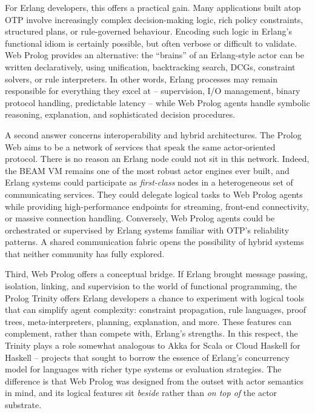 For Erlang developers, this offers a practical gain. Many applications built atop OTP involve increasingly complex decision-making logic, rich policy constraints, structured plans, or rule-governed behaviour. Encoding such logic in Erlang's functional idiom is certainly possible, but often verbose or difficult to validate. Web Prolog provides an alternative: the ``brains'' of an Erlang-style actor can be written declaratively, using unification, backtracking search, DCGs, constraint solvers, or rule interpreters. In other words, Erlang processes may remain responsible for everything they excel at -- supervision, I/O management, binary protocol handling, predictable latency -- while Web Prolog agents handle symbolic reasoning, explanation, and sophisticated decision procedures.

A second answer concerns interoperability and hybrid architectures. The Prolog Web aims to be a network of services that speak the same actor-oriented protocol. There is no reason an Erlang node could not sit in this network. Indeed, the BEAM VM remains one of the most robust actor engines ever built, and Erlang systems could participate as \emph{first-class} nodes in a heterogeneous set of communicating services. They could delegate logical tasks to Web Prolog agents while providing high-performance endpoints for streaming, front-end connectivity, or massive connection handling. Conversely, Web Prolog agents could be orchestrated or supervised by Erlang systems familiar with OTP's reliability patterns. A shared communication fabric opens the possibility of hybrid systems that neither community has fully explored.

Third, Web Prolog offers a conceptual bridge. If Erlang brought message passing, isolation, linking, and supervision to the world of functional programming, the Prolog Trinity offers Erlang developers a chance to experiment with logical tools that can simplify agent complexity: constraint propagation, rule languages, proof trees, meta-interpreters, planning, explanation, and more. These features can complement, rather than compete with, Erlang's strengths. In this respect, the Trinity plays a role somewhat analogous to Akka for Scala or Cloud Haskell for Haskell -- projects that sought to borrow the essence of Erlang's concurrency model for languages with richer type systems or evaluation strategies. The difference is that Web Prolog was designed from the outset with actor semantics in mind, and its logical features sit \emph{beside} rather than \emph{on top of} the actor substrate.


